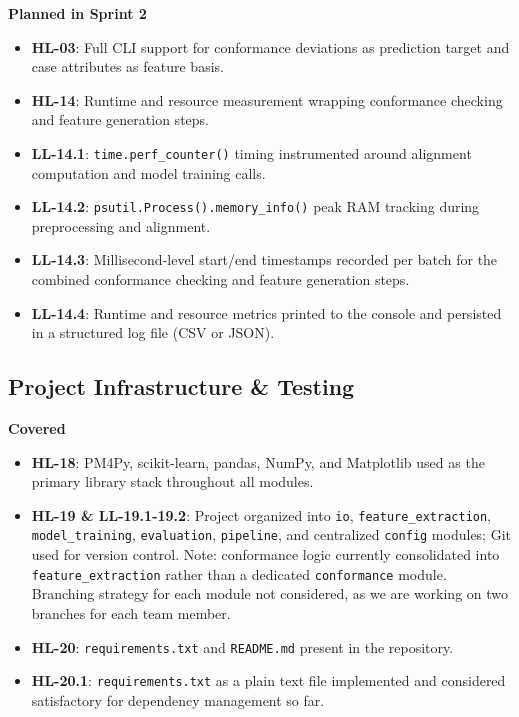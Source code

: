 \documentclass[12pt,a4paper]{article}
\begin{document}
\noindent \textbf{Planned in Sprint 2}
\begin{itemize}
    \item \textbf{HL-03}: Full CLI support for conformance deviations as prediction target and case attributes as feature basis.
    \item \textbf{HL-14}: Runtime and resource measurement wrapping conformance checking and feature generation steps.
    \item \textbf{LL-14.1}: \texttt{time.perf\_counter()} timing instrumented around alignment computation and model training calls.
    \item \textbf{LL-14.2}: \texttt{psutil.Process().memory\_info()} peak RAM tracking during preprocessing and alignment.
    \item \textbf{LL-14.3}: Millisecond-level start/end timestamps recorded per batch for the combined conformance checking and feature generation steps.
    \item \textbf{LL-14.4}: Runtime and resource metrics printed to the console and persisted in a structured log file (CSV or JSON).
\end{itemize}

\subsection{Project Infrastructure \& Testing}
\textbf{Covered}
\begin{itemize}
    \item \textbf{HL-18}: PM4Py, scikit-learn, pandas, NumPy, and Matplotlib used as the primary library stack throughout all modules.
    \item \textbf{HL-19 \& LL-19.1-19.2}: Project organized into \texttt{io}, \texttt{feature\_extraction}, \texttt{model\_training}, \texttt{evaluation}, \texttt{pipeline}, and centralized \texttt{config} modules; Git used for version control. Note: conformance logic currently consolidated into \texttt{feature\_extraction} rather than a dedicated \texttt{conformance} module. Branching strategy for each module not considered, as we are working on two branches for each team member.
    \item \textbf{HL-20}: \texttt{requirements.txt} and \texttt{README.md} present in the repository.
    \item \textbf{HL-20.1}: \texttt{requirements.txt} as a plain text file implemented and considered satisfactory for dependency management so far.
\end{itemize}
\end{document}
